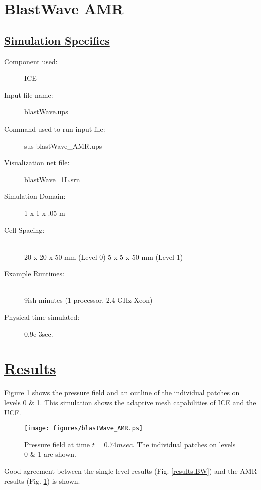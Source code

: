 \documentclass[fleqn]{article}
\begin{document}

\section*{\center BlastWave AMR}
\subsection*{\underline{Simulation Specifics}}
\begin{description} 
\item [Component used:] \hfill ICE
\item [Input file name:] \hfill blastWave.ups
\item [Command used to run input file:]\hfill sus blastWave\_AMR.ups
\item [Visualization net file:]\hfill blastWave\_1L.srn\\


\item [Simulation Domain:]\hfill    1 x 1 x .05 m
\item [Cell Spacing:]\hfill \\ 
20 x 20 x 50 mm (Level 0) 
5 x 5 x 50 mm (Level 1)


\item [Example Runtimes:] \hfill \\
 9ish minutes   (1 processor, 2.4 GHz Xeon)

\item [Physical time simulated:] \hfill 0.9e-3sec.

\end{description}

\section*{\underline{Results}}
Figure \ref{results.BW.AMR} shows the pressure field and an outline of the individual patches on
levels 0 \& 1.  This simulation shows the adaptive mesh capabilities of ICE and the UCF.  
\begin{figure}
\texttt{[image: figures/blastWave\_AMR.ps]}
\caption{Pressure field at time $t = 0.74msec$.  The individual patches on levels 0 \& 1 are shown.}
\label{results.BW.AMR}
\end{figure}
Good agreement between the single level results (Fig. \ref{results.BW}) and the AMR results (Fig.
\ref{results.BW.AMR}) is shown.
\newpage

\end{document}
